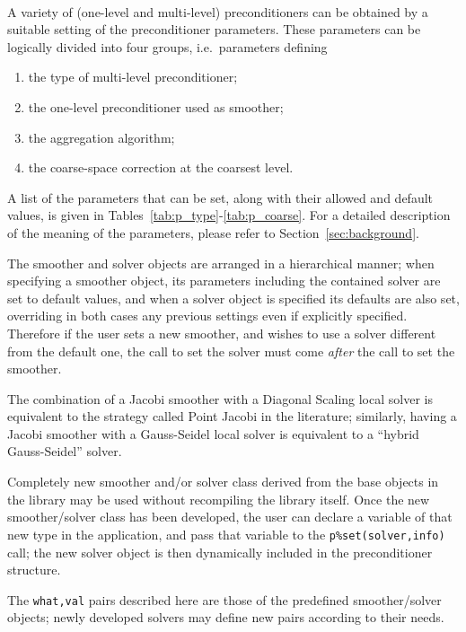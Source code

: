 \ \\
A variety of (one-level and multi-level) preconditioners can be obtained
by a suitable setting of the preconditioner parameters. These parameters
can be logically divided into four groups, i.e.\ parameters defining
\begin{enumerate}
	\item the type of multi-level preconditioner;
	\item the one-level preconditioner used as smoother;
	\item the aggregation algorithm;
	\item the coarse-space correction at the coarsest level.
\end{enumerate}
A list of the parameters that can be set, along with their allowed and
default values, is given in Tables~\ref{tab:p_type}-\ref{tab:p_coarse}.
For a detailed description  of the meaning of the parameters, please
refer to Section~\ref{sec:background}. 

%
The smoother and solver objects are arranged in a hierarchical manner;
when specifying a smoother object, its parameters including the
contained solver are set to  default values, and when a solver
object is specified its defaults are also set, overriding in both
cases any previous settings even if explicitly specified. Therefore if
the user sets a new smoother, and wishes to use a solver
different from  the default one, the call to set the solver must come
\emph{after} the call to set the smoother. 
%

The combination of a Jacobi smoother with a Diagonal Scaling local
solver is equivalent to the strategy called Point Jacobi in the
literature; similarly, having a Jacobi smoother with a Gauss-Seidel
local solver is equivalent to a ``hybrid Gauss-Seidel'' solver. 


 Completely new smoother and/or  solver class derived from the
base objects in the library may be used without recompiling the
library itself. Once the new smoother/solver  class has been
developed, the user can declare a variable of that new type in the
application, and pass that variable to the \verb|p%set(solver,info)|
call; the new solver object is then dynamically included in the
preconditioner structure. 

The \verb|what,val| pairs described here are those of the predefined
smoother/solver objects; newly developed solvers may define new pairs
according to their needs. 


